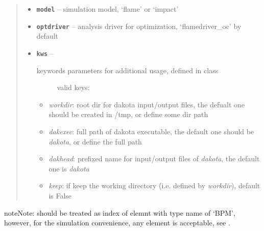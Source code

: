 \documentclass[letterpaper,10pt,english]{sphinxmanual}
\begin{document}
\begin{fulllineitems}
\begin{quote}
\begin{description}
\begin{itemize}
\begin{enumerate}
\end{enumerate}


\item {} 
\textbf{\texttt{model}} -- simulation model, `flame' or `impact'

\item {} 
\textbf{\texttt{optdriver}} -- analysis driver for optimization, `flamedriver\_oc' by default

\item {} 
\textbf{\texttt{kws}} -- \begin{description}
\item[{keywords parameters for additional usage, defined in  class}] \leavevmode
valid keys:

\end{description}
\begin{itemize}
\item {} 
\emph{workdir}: root dir for dakota input/output files,
the defualt one should be created in /tmp, or define some dir path

\item {} 
\emph{dakexec}: full path of dakota executable,
the default one should be \emph{dakota}, or define the full path

\item {} 
\emph{dakhead}: prefixed name for input/output files of \emph{dakota}, 
the default one is \emph{dakota}

\item {} 
\emph{keep}: if keep the working directory (i.e. defined by \emph{workdir}), 
default is False

\end{itemize}


\end{itemize}

\end{description}\end{quote}

\begin{notice}{note}{Note:}
 should be treated as index of elemnt with type name of `BPM',
however, for the simulation convenience, any element is acceptable, see {\hyperref[src/apidocs/dakopt:genopt.dakopt.DakotaOC.set_bpms]{}}.
\end{notice}

\begin{fulllineitems}
\label{src/apidocs/dakopt:genopt.dakopt.DakotaOC.bpms}
\end{fulllineitems}


\end{fulllineitems}
\end{document}
